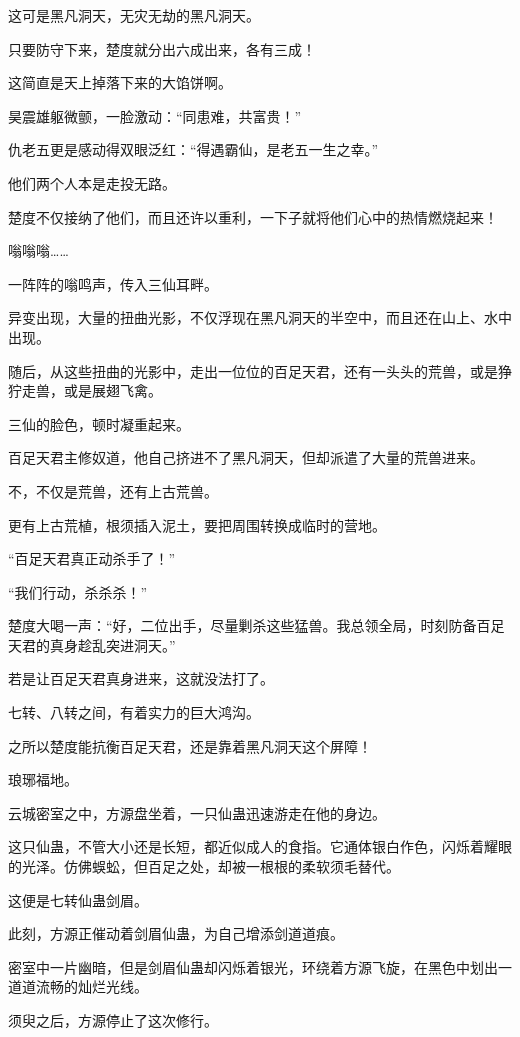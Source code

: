 \begin{this_body}
这可是黑凡洞天，无灾无劫的黑凡洞天。

只要防守下来，楚度就分出六成出来，各有三成！

这简直是天上掉落下来的大馅饼啊。

昊震雄躯微颤，一脸激动：“同患难，共富贵！”

仇老五更是感动得双眼泛红：“得遇霸仙，是老五一生之幸。”

他们两个人本是走投无路。

楚度不仅接纳了他们，而且还许以重利，一下子就将他们心中的热情燃烧起来！

嗡嗡嗡……

一阵阵的嗡鸣声，传入三仙耳畔。

异变出现，大量的扭曲光影，不仅浮现在黑凡洞天的半空中，而且还在山上、水中出现。

随后，从这些扭曲的光影中，走出一位位的百足天君，还有一头头的荒兽，或是狰狞走兽，或是展翅飞禽。

三仙的脸色，顿时凝重起来。

百足天君主修奴道，他自己挤进不了黑凡洞天，但却派遣了大量的荒兽进来。

不，不仅是荒兽，还有上古荒兽。

更有上古荒植，根须插入泥土，要把周围转换成临时的营地。

“百足天君真正动杀手了！”

“我们行动，杀杀杀！”

楚度大喝一声：“好，二位出手，尽量剿杀这些猛兽。我总领全局，时刻防备百足天君的真身趁乱突进洞天。”

若是让百足天君真身进来，这就没法打了。

七转、八转之间，有着实力的巨大鸿沟。

之所以楚度能抗衡百足天君，还是靠着黑凡洞天这个屏障！

琅琊福地。

云城密室之中，方源盘坐着，一只仙蛊迅速游走在他的身边。

这只仙蛊，不管大小还是长短，都近似成人的食指。它通体银白作色，闪烁着耀眼的光泽。仿佛蜈蚣，但百足之处，却被一根根的柔软须毛替代。

这便是七转仙蛊剑眉。

此刻，方源正催动着剑眉仙蛊，为自己增添剑道道痕。

密室中一片幽暗，但是剑眉仙蛊却闪烁着银光，环绕着方源飞旋，在黑色中划出一道道流畅的灿烂光线。

须臾之后，方源停止了这次修行。


\end{this_body}
